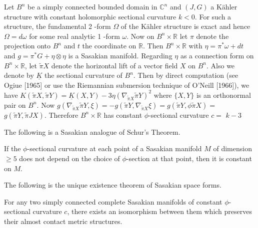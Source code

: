 \begin{example}
    Let $B^n$ be a simply connected bounded domain in $\mathbb{C}^n$ and $(J, G)$ a Kähler structure with constant holomorphic sectional curvature $k<0$. For such a structure, the fundamental 2 -form $\Omega$ of the Kähler structure is exact and hence $\Omega=d \omega$ for some real analytic 1 -form $\omega$. Now on $B^n \times \mathbb{R}$ let $\pi$ denote the projection onto $B^n$ and $t$ the coordinate on $\mathbb{R}$. Then $B^n \times \mathbb{R}$ with $\eta=\pi^* \omega+d t$ and $g=\pi^* G+\eta \otimes \eta$ is a Sasakian manifold. Regarding $\eta$ as a connection form on $B^n \times \mathbb{R}$, let $\tilde{\pi} X$ denote the horizontal lift of a vector field $X$ on $B^n$. Also we denote by $\underline{K}$ the sectional curvature of $B^n$. Then by direct computation (see Ogiue [1965] or use the Riemannian submersion technique of O'Neill [1966]), we have $K(\tilde{\pi} X, \tilde{\pi} Y)=\underline{K}(X, Y)-3 \eta\left(\nabla_{\tilde{\pi} X} \tilde{\pi} Y\right)^2$ where $\{X, Y\}$ is an orthonormal pair on $B^n$. Now $g\left(\nabla_{\tilde{\pi} X} \tilde{\pi} Y, \xi\right)=-g\left(\tilde{\pi} Y, \nabla_{\tilde{\pi} X} \xi\right)=g(\tilde{\pi} Y, \phi \tilde{\pi} X)=$ $g(\tilde{\pi} Y, \tilde{\pi} J X)$. Therefore $B^n \times \mathbb{R}$ has constant $\phi$-sectional curvature $c=$ $k-3$
\end{example}

The following is a Sasakian analogue of Schur’s Theorem.
\begin{theorem}
     If the $\phi$-sectional curvature at each point of a Sasakian manifold $M$ of dimension $\geq 5$ does not depend on the choice of $\phi$-section at that point, then it is constant on $M$.
\end{theorem}

The following is the unique
existence theorem of Sasakian space forms.
\begin{theorem}
    For any two simply connected complete Sasakian manifolds of constant $\phi$-sectional curvature $c$, there exists an isomorphism between them which preserves their almost contact metric structures.
\end{theorem}

